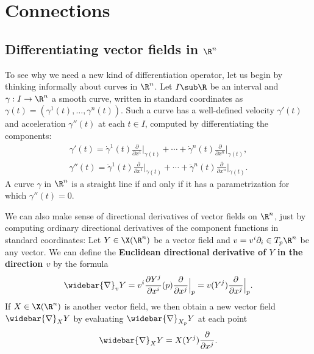 \section{Connections}
\subsection{Differentiating vector fields in \texorpdfstring{$\R^n$}{R}}
To see why we need a new kind of differentiation operator, let us begin by thinking informally about curves in $\R^n$. Let $I\sub\R$ be an interval and $\gamma:I\to\R^n$ a smooth curve, written in standard coordinates as $\gamma(t)=(\gamma^1(t),\dots,\gamma^n(t))$. Such a curve has a well-defined velocity $\gamma'(t)$ and acceleration $\gamma''(t)$ at each $t\in I$, computed by differentiating the components:
\begin{align}\label{Euclidean curve derivative}
\gamma'(t)=\dot{\gamma}^1(t)\frac{\partial}{\partial x^1}\Big|_{\gamma(t)}+\cdots+\dot{\gamma}^n(t)\frac{\partial}{\partial x^n}\Big|_{\gamma(t)},
\end{align}
\begin{align}\label{Euclidean curve acceleration}
\gamma''(t)=\ddot{\gamma}^1(t)\frac{\partial}{\partial x^1}\Big|_{\gamma(t)}+\cdots+\ddot{\gamma}^n(t)\frac{\partial}{\partial x^n}\Big|_{\gamma(t)}.
\end{align}
A curve $\gamma$ in $\R^n$ is a straight line if and only if it has a parametrization for which $\gamma''(t)=0$.\par
We can also make sense of directional derivatives of vector fields on $\R^n$, just by computing ordinary directional derivatives of the component functions in standard coordinates: Let $Y\in\X(\R^n)$ be a vector field and $v=v^i\partial_i\in T_p\R^n$ be any vector. We can define the \textbf{Euclidean directional derivative of $Y$ in the direction $v$} by the formula
\begin{align}\label{Euclidean directional derivative}
\widebar{\nabla}_vY=v^i\frac{\partial Y^j}{\partial x^i}(p)\frac{\partial}{\partial x^j}\Big|_p=v(Y^j)\frac{\partial}{\partial x^j}\Big|_p.
\end{align}
If $X\in\X(\R^n)$ is another vector field, we then obtain a new vector field $\widebar{\nabla}_XY$ by evaluating $\widebar{\nabla}_{X_p}Y$ at each point 
\[\widebar{\nabla}_XY=X(Y^j)\frac{\partial}{\partial x^j}.\]
